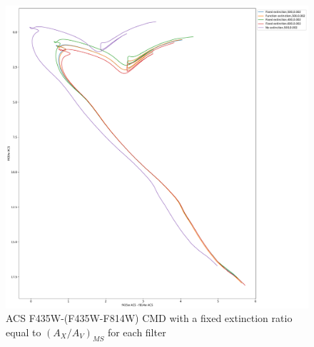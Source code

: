 \documentclass[12pt, a4paper]{report}
\begin{document}
\begin{figure}[h]
\begin{center}
\includegraphics[scale=0.3]{../basti_isochrones_10_13Gyr/Extinction_T5k_FeH0fix_func_f435wACS_f435wACSmf814wACS_500_400_600_Myr_FeH_0p002_ref_noext_Av_1p0.pdf}
\caption{ACS F435W-(F435W-F814W) CMD with a fixed extinction ratio equal to $(A_{X}/A_{V})_{MS}$ for each filter}
\label{acs_isoc_T5k}
\end{center}
\end{figure}
\end{document}
